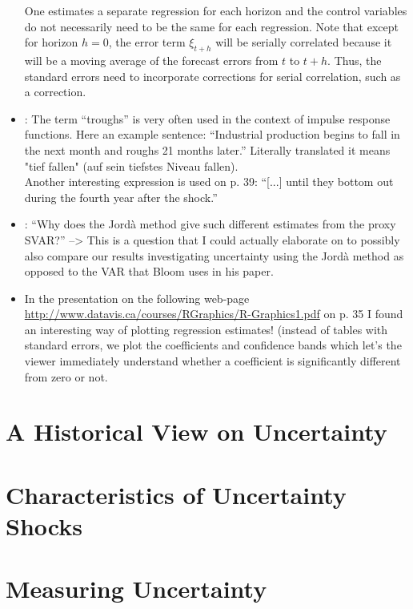 \documentclass[a4paper,12pt,oneside,pointednumbers,numbers=noenddot,bibtotoc,bigheadings,liststotoc,chapterprefix=true]{scrbook}
\begin{document}
\begin{itemize}
	One estimates a separate regression for each horizon and the control variables do not necessarily need to be the same for each regression. Note that except for horizon $h=0$, the error term $\xi_{t+h}$ will be serially correlated because it will be a moving average of the forecast errors from $t$ to $t+h$. Thus, the standard errors need to incorporate corrections for serial correlation, such as a \citep{newest:87} correction.
	\item \citet[p. 37]{ramey:16}: The term ``troughs'' is very often used in the context of impulse response functions. Here an example sentence: ``Industrial production begins to fall in the next month and roughs 21 months later.'' Literally translated it means "tief fallen" (auf sein tiefstes Niveau fallen).\\
	Another interesting expression is used on p. 39: ``[...] until they bottom out during the fourth year after the shock.''
	\item \citet[p. 45]{ramey:16}: ``Why does the Jordà method give such different estimates from the proxy SVAR?'' --> This is a question that I could actually elaborate on to possibly also compare our results investigating uncertainty using the Jordà method as opposed to the VAR that Bloom uses in his paper.
	\item In the presentation on the following web-page \url{http://www.datavis.ca/courses/RGraphics/R-Graphics1.pdf} on p. 35 I found an interesting way of plotting regression estimates! (instead of tables with standard errors, we plot the coefficients and confidence bands which let's the viewer immediately understand whether a coefficient is significantly different from zero or not.
\end{itemize}




\section{A Historical View on Uncertainty}




\section{Characteristics of Uncertainty Shocks}


\section{Measuring Uncertainty}
\end{document}
